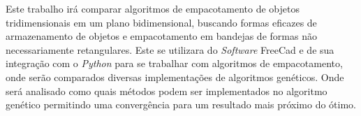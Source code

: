 Este trabalho irá comparar algoritmos de empacotamento de objetos tridimensionais em um plano bidimensional, buscando formas eficazes de armazenamento de objetos e empacotamento em bandejas de formas não necessariamente retangulares.
Este se utilizara do \textit{Software} FreeCad e de sua integração com o \textit{Python} para se trabalhar com algoritmos de empacotamento, onde serão comparados diversas implementações de algoritmos genéticos.
Onde será analisado como quais métodos podem ser implementados no algoritmo genético permitindo uma convergência para um resultado mais próximo do ótimo.
